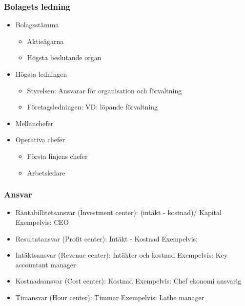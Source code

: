\documentclass{article}
\begin{document}
\subsubsection{Bolagets ledning}
\begin{itemize}
    \item Bolagsstämma 
    \begin{itemize}
        \item Aktieägarna
        \item Högsta beslutande organ
    \end{itemize}
    \item Högsta ledningen
    \begin{itemize}
        \item Styrelsen: \newline
        Ansvarar för organisation och förvaltning
        \item Företagsledningen: \newline
        VD: löpande förvaltning
    \end{itemize}
    \item Mellanchefer
    \item Operativa chefer
    \begin{itemize}
        \item Första linjens chefer 
        \item Arbetsledare
    \end{itemize}
\end{itemize}

\subsubsection{Ansvar}
\begin{itemize}
    \item Räntabillitetsansvar (Investment center): (intäkt - kostnad)/ Kapital \newline
    Exempelvis: CEO
    \item Resultatansvar (Profit center): Intäkt - Kostnad \newline
    Exempelvis: 
    \item Intäktsansvar (Revenue center): Intäkter och kostnad \newline
    Exempelvis: Key accountant manager
    \item Kostnadsansvar (Cost center): Kostnad  \newline
    Exempelvis: Chef ekonomi ansvarig
    \item Timansvar (Hour center): Timmar \newline
    Exempelvis: Lathe manager
\end{itemize}
\end{document}
